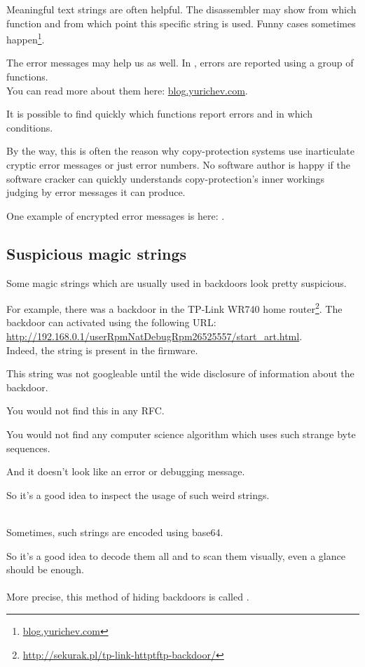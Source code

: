 Meaningful text strings are often helpful.
The \IDA disassembler may show from which function and from which point this specific string is used.
Funny cases sometimes happen\footnote{\href{http://blog.yurichev.com/node/32}{blog.yurichev.com}}.

The error messages may help us as well.
In \oracle, errors are reported using a group of functions.\\
You can read more about them here: \href{http://blog.yurichev.com/node/43}{blog.yurichev.com}.


It is possible to find quickly which functions report errors and in which conditions.

By the way, this is often the reason why copy-protection systems use inarticulate cryptic error messages 
or just error numbers.
No software author is happy if the software cracker can quickly understands copy-protection's inner workings
judging by error messages it can produce.

One example of encrypted error messages is here: .

\subsection{Suspicious magic strings}

Some magic strings which are usually used in backdoors look pretty suspicious.

For example, there was a backdoor in the TP-Link WR740 home router\footnote{\url{http://sekurak.pl/tp-link-httptftp-backdoor/}}.
The backdoor can activated using the following URL:\\
\url{http://192.168.0.1/userRpmNatDebugRpm26525557/start_art.html}.\\

Indeed, the  string is present in the firmware.

This string was not googleable until the wide disclosure of information about the backdoor.

You would not find this in any \ac{RFC}.

You would not find any computer science algorithm which uses such strange byte sequences.

And it doesn't look like an error or debugging message.

So it's a good idea to inspect the usage of such weird strings.\\
\\

Sometimes, such strings are encoded using base64.

So it's a good idea to decode them all and to scan them visually, even a glance should be enough.\\
\\
More precise, this method of hiding backdoors is called .

